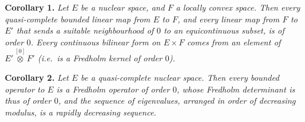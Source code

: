 \documentclass[british]{article}
\newenvironment{itenv}[1]
  {\phantomsection\par\smallskip\noindent\textbf{#1.}\itshape}
  {\par\smallskip}
\begin{document}
\protect{}\label{section-2-theorem-10-corollary-1}
\begin{itenv}{Corollary 1}
Let \(E\) be a nuclear space, and \(F\) a locally convex space. Then
every quasi-complete bounded linear map from \(E\) to \(F\), and every
linear map from \(F\) to \(E'\) that sends a suitable neighbourhood of
\(0\) to an equicontinuous subset, is of order \(0\). Every continuous
bilinear form on \(E\times F\) comes from an element of
\(E'\overset{[0]}{\otimes}F'\) (i.e.~is a Fredholm kernel of order
\(0\)).

\end{itenv}

\protect{}\label{section-2-theorem-10-corollary-2}
\begin{itenv}{Corollary 2}
Let \(E\) be a quasi-complete nuclear space. Then every bounded operator
to \(E\) is a Fredholm operator of order \(0\), whose Fredholm
determinant is thus of order \(0\), and the sequence of eigenvalues,
arranged in order of decreasing modulus, is a rapidly decreasing
sequence.

\end{itenv}
\end{document}
